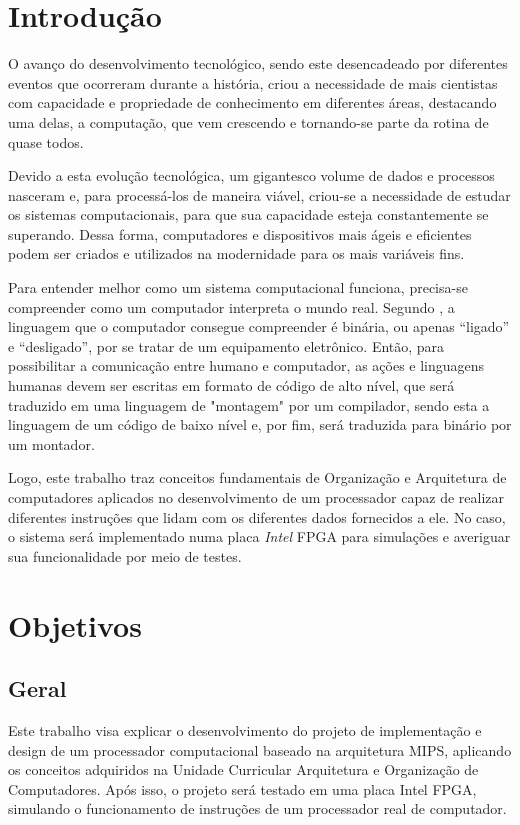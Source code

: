 \documentclass[
	12pt,				%
	openright,			%
	a4paper,			%
	english,			%
	french,				%
	spanish,			%
	brazil,				%
	]{abntex2}
\begin{document}
\chapter{Introdução}
O avanço do desenvolvimento tecnológico, sendo este desencadeado por diferentes eventos que ocorreram durante a história, criou a necessidade de mais cientistas com capacidade e propriedade de conhecimento em diferentes áreas, destacando uma delas, a computação, que vem crescendo e tornando-se parte da rotina de quase todos.

Devido a esta evolução tecnológica, um gigantesco volume de dados e processos nasceram e, para processá-los de maneira viável, criou-se a necessidade de estudar os sistemas computacionais, para que sua capacidade esteja constantemente se superando. Dessa forma, computadores e dispositivos mais ágeis e eficientes podem ser criados e utilizados na modernidade para os mais variáveis fins.

Para entender melhor como um sistema computacional funciona, precisa-se compreender como um computador interpreta o mundo real. Segundo \cite{patterson2007}, a linguagem que o computador consegue compreender é binária, ou apenas “ligado” e “desligado”, por se tratar de um equipamento eletrônico. Então, para possibilitar a comunicação entre humano e computador, as ações e linguagens humanas devem ser escritas em formato de código de alto nível, que será traduzido em uma linguagem de "montagem" por um compilador, sendo esta a linguagem de um código de baixo nível e, por fim, será traduzida para binário por um montador.

Logo, este trabalho traz conceitos fundamentais de Organização e Arquitetura de computadores aplicados no desenvolvimento de um processador capaz de realizar diferentes instruções que lidam com os diferentes dados fornecidos a ele. No caso, o sistema será implementado numa placa \emph{Intel} FPGA para simulações e averiguar sua funcionalidade por meio de testes.

\chapter[Objetivos]{Objetivos}
\section{Geral}
Este trabalho visa explicar o desenvolvimento do projeto de implementação e design de um processador computacional baseado na arquitetura MIPS, aplicando os conceitos adquiridos na Unidade Curricular Arquitetura e Organização de Computadores. Após isso, o projeto será testado em uma placa Intel FPGA, simulando o funcionamento de instruções de um processador real de computador.
\end{document}

